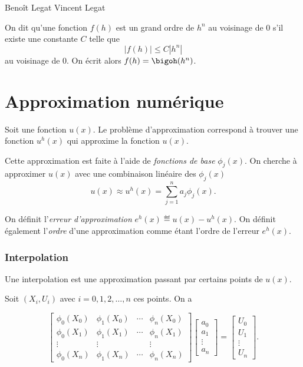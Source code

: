 

\newcommand\fv[1]{{\bf #1}} %
\usepackage{graphicx}
\usepackage{listings}
\usepackage{numprint}
\DeclareMathOperator{\dist}{dist}

{Beno\^it Legat}
{Vincent Legat}


\begin{mydef}
  On dit qu'une fonction $f(h)$ est un grand ordre de $h^n$ au voisinage
  de 0 s'il existe une constante $C$ telle que
  \[ |f(h)| \leq C |h^n| \]
  au voisinage de 0.
  On écrit alors $f(h) = \bigoh(h^n)$.
\end{mydef}

\part{Approximation numérique}
Soit une fonction $u(x)$.
Le problème d'approximation correspond à trouver une fonction
$u^h(x)$ qui approxime la fonction $u(x)$.

Cette approximation est faite à l'aide de \emph{fonctions de base} $\phi_j(x)$.
On cherche à approximer $u(x)$ avec une combinaison linéaire des $\phi_j(x)$
\[ u(x) \approx u^h(x) = \sum_{j=1}^n a_j \phi_j(x). \]

On définit l'\emph{erreur d'approximation} $e^h(x) \eqdef u(x) - u^h(x)$.
On définit également l'\emph{ordre} d'une approximation comme étant l'ordre de
l'erreur $e^h(x)$.

\section{Interpolation}
Une interpolation est une approximation passant par certains points de $u(x)$.

Soit $(X_i, U_i)$ avec $i = 0, 1, 2, \ldots, n$ ces points. On a

\[\begin{bmatrix}
	\phi_0(X_0) & \phi_1(X_0) & \cdots & \phi_n(X_0)  \\
	\phi_0(X_1) & \phi_1(X_1)	& \cdots & \phi_n(X_1)  \\
	\vdots			& \vdots 			& 			 & \vdots \\
	\phi_0(X_n) & \phi_1(X_n)	& \cdots & \phi_n(X_n)
\end{bmatrix}
\begin{bmatrix}
	a_0 			\\
	a_1 			\\
	\vdots	\\
	a_n 			
\end{bmatrix}
=
\begin{bmatrix}
	U_0 			\\
	U_1 			\\
	\vdots	\\
	U_n 			
\end{bmatrix}.\]

